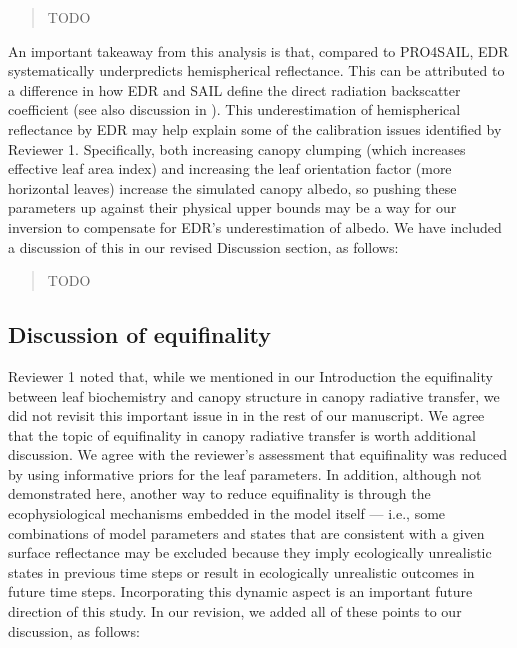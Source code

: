 \documentclass{article}
\begin{document}
\begin{quote}

  TODO

\end{quote}

An important takeaway from this analysis is that, compared to PRO4SAIL, EDR systematically underpredicts hemispherical reflectance.
This can be attributed to a difference in how EDR and SAIL define the direct radiation backscatter coefficient (see also discussion in \citealt{yuan2017reexamination}).
This underestimation of hemispherical reflectance by EDR may help explain some of the calibration issues identified by Reviewer 1.
Specifically, both increasing canopy clumping (which increases effective leaf area index) and increasing the leaf orientation factor (more horizontal leaves) increase the simulated canopy albedo,
so pushing these parameters up against their physical upper bounds may be a way for our inversion to compensate for EDR's underestimation of albedo.
We have included a discussion of this in our revised Discussion section, as follows:

\begin{quote}
TODO
\end{quote}

\subsection{Discussion of equifinality}\label{subsec:equifinality}

Reviewer 1 noted that, while we mentioned in our Introduction the equifinality between leaf biochemistry and canopy structure in canopy radiative transfer, we did not revisit this important issue in in the rest of our manuscript.
We agree that the topic of equifinality in canopy radiative transfer is worth additional discussion.
We agree with the reviewer's assessment that equifinality was reduced by using informative priors for the leaf parameters.
In addition, although not demonstrated here, another way to reduce equifinality is through the ecophysiological mechanisms embedded in the model itself --- i.e., some combinations of model parameters and states that are consistent with a given surface reflectance may be excluded because they imply ecologically unrealistic states in previous time steps or result in ecologically unrealistic outcomes in future time steps.
Incorporating this dynamic aspect is an important future direction of this study.
In our revision, we added all of these points to our discussion, as follows:
\end{document}
